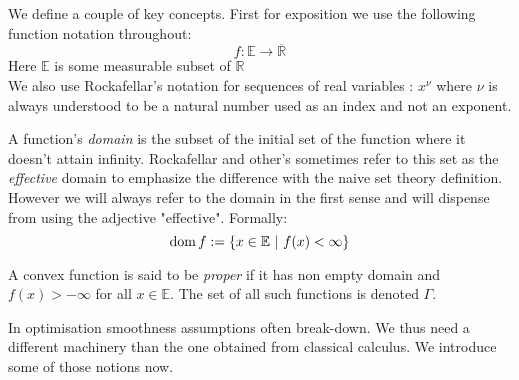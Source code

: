 We define a couple of key concepts. 
First for exposition we use the following function notation throughout:
\begin{equation*}
	f: \mathbb E \longrightarrow \overline{\mathbb R} 
\end{equation*}
Here $\mathbb E$ is some measurable subset of $\mathbb R$\\
We also use Rockafellar's notation \autocite{rockafellar2009variational} for 
sequences of real variables : $x^{\nu}$ where $\nu$ is always understood 
to be a natural number used as an index and not an exponent.
\begin{definition}
A function's \emph{domain} is the subset of the initial set 
of the function where it doesn't attain infinity. Rockafellar
and other's sometimes refer to this set as the \emph{effective} domain
to emphasize the difference with the naive set theory definition. However
we will always refer to the domain in the first sense and will dispense from
using the adjective "effective". Formally:
\begin{equation*}
	\mathrm{dom} \, f := \{x\in\mathbb E \ |\ f(x)< \infty\}
\end{equation*}
\end{definition}
%
\begin{definition}
	A convex function is said to be \emph{proper} if it has non empty domain
	and $f(x)>-\infty$ for all $x\in\mathbb E$. The set of all such functions
	is denoted $\Gamma$.
\end{definition}

\noindent In optimisation smoothness assumptions often break-down. We thus need
a different machinery than the one obtained from classical calculus. We introduce
some of those notions now. 

